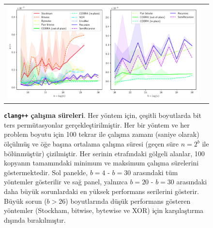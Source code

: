\documentclass[10pt]{article}
\begin{document}
\begin{figure}[ht!]
\centering
\begin{tabular}{cc}
  \includegraphics[width=6in]{results/clang++_run_times.pdf}
\end{tabular}
\caption{{\bf {\tt clang++} \c{c}al{\i}\c{s}ma s\"{u}releri}. 
Her y\"{o}ntem i\c{c}in, \c{c}e\c{s}itli boyutlarda bit ters perm\"{u}tasyonlar ger\c{c}ekle\c{s}tirilmi\c{s}tir. 
Her bir y\"{o}ntem ve her problem boyutu i\c{c}in 100 tekrar ile \c{c}al{\i}\c{s}ma 
zaman{\i} (saniye olarak) \"{o}l\c{c}\"{u}lm\"{u}\c{s} ve \"{o}\u{g}e ba\c{s}{\i}na ortalama \c{c}al{\i}\c{s}ma 
s\"{u}resi (ge\c{c}en s\"{u}re $n = 2^b$ ile b\"{o}l\"{u}nm\"{u}\c{s}t\"{u}r) \c{c}izilmi\c{s}tir. 
Her serinin etraf{\i}ndaki g\"{o}lgeli alanlar, 100 kopyan{\i}n tamam{\i}ndaki 
minimum ve maksimum \c{c}al{\i}\c{s}ma s\"{u}relerini g\"{o}stermektedir. Sol panelde, 
$b=4$ - $b=30$ aras{\i}ndaki t\"{u}m y\"{o}ntemler g\"{o}sterilir ve sa\u{g} panel, 
yaln{\i}zca $b=20$ - $b=30$ aras{\i}ndaki daha b\"{u}y\"{u}k sorunlardaki en y\"{u}ksek 
performans serilerini g\"{o}sterir. B\"{u}y\"{u}k sorun ($b>26$) boyutlar{\i}nda d\"{u}\c{s}\"{u}k 
performans g\"{o}steren y\"{o}ntemler (Stockham, bitwise, bytewise ve XOR) 
i\c{c}in kar\c{s}{\i}la\c{s}t{\i}rma d{\i}\c{s}{\i}nda b{\i}rak{\i}lm{\i}\c{s}t{\i}r.
  \label{fig:clang++_runtimes}  
}
\end{figure}
\end{document}
